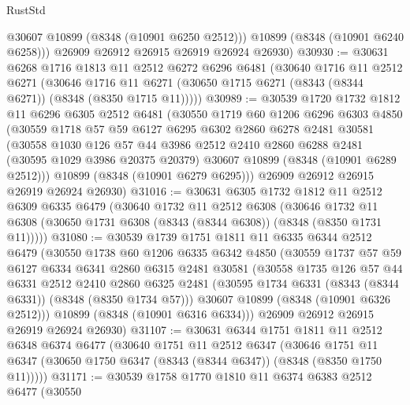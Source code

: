 \begin{lexlean}{RustStd}
\begin{coremodule}
          @30607
          @10899
          (@8348 (@10901 @6250 @2512)))
        @10899
        (@8348 (@10901 @6240 @6258)))
      @26909
      @26912
      @26915
      @26919
      @26924
      @26930)
@30930 := @30631
    @6268
    @1716
    @1813
    @11
    @2512
    @6272
    @6296
    @6481
    (@30640
      @1716
      @11
      @2512
      @6271
      (@30646 @1716 @11 @6271 (@30650 @1715 @6271 (@8343 (@8344 @6271)) (@8348 (@8350 @1715 @11)))))
@30989 := @30539
    @1720
    @1732
    @1812
    @11
    @6296
    @6305
    @2512
    @6481
    (@30550
      @1719
      @60
      @1206
      @6296
      @6303
      @4850
      (@30559
        @1718
        @57
        @59
        @6127
        @6295
        @6302
        @2860
        @6278
        @2481
        @30581
        (@30558
          @1030
          @126
          @57
          @44
          @3986
          @2512
          @2410
          @2860
          @6288
          @2481
          (@30595 @1029 @3986 @20375 @20379)
          @30607
          @10899
          (@8348 (@10901 @6289 @2512)))
        @10899
        (@8348 (@10901 @6279 @6295)))
      @26909
      @26912
      @26915
      @26919
      @26924
      @26930)
@31016 := @30631
    @6305
    @1732
    @1812
    @11
    @2512
    @6309
    @6335
    @6479
    (@30640
      @1732
      @11
      @2512
      @6308
      (@30646 @1732 @11 @6308 (@30650 @1731 @6308 (@8343 (@8344 @6308)) (@8348 (@8350 @1731 @11)))))
@31080 := @30539
    @1739
    @1751
    @1811
    @11
    @6335
    @6344
    @2512
    @6479
    (@30550
      @1738
      @60
      @1206
      @6335
      @6342
      @4850
      (@30559
        @1737
        @57
        @59
        @6127
        @6334
        @6341
        @2860
        @6315
        @2481
        @30581
        (@30558
          @1735
          @126
          @57
          @44
          @6331
          @2512
          @2410
          @2860
          @6325
          @2481
          (@30595 @1734 @6331 (@8343 (@8344 @6331)) (@8348 (@8350 @1734 @57)))
          @30607
          @10899
          (@8348 (@10901 @6326 @2512)))
        @10899
        (@8348 (@10901 @6316 @6334)))
      @26909
      @26912
      @26915
      @26919
      @26924
      @26930)
@31107 := @30631
    @6344
    @1751
    @1811
    @11
    @2512
    @6348
    @6374
    @6477
    (@30640
      @1751
      @11
      @2512
      @6347
      (@30646 @1751 @11 @6347 (@30650 @1750 @6347 (@8343 (@8344 @6347)) (@8348 (@8350 @1750 @11)))))
@31171 := @30539
    @1758
    @1770
    @1810
    @11
    @6374
    @6383
    @2512
    @6477
    (@30550

\end{coremodule}
\end{lexlean}
